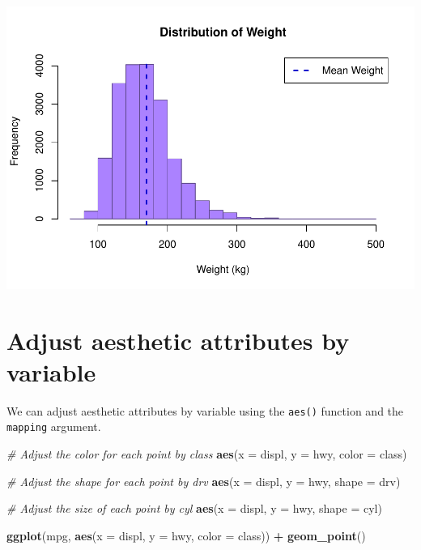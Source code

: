 \documentclass[
]{book}
\newenvironment{Shaded}{\begin{snugshade}}{\end{snugshade}}
\newcommand{\CommentTok}[1]{\textcolor[rgb]{0.56,0.35,0.01}{\textit{#1}}}
\newcommand{\DataTypeTok}[1]{\textcolor[rgb]{0.13,0.29,0.53}{#1}}
\newcommand{\KeywordTok}[1]{\textcolor[rgb]{0.13,0.29,0.53}{\textbf{#1}}}
\newcommand{\NormalTok}[1]{#1}
\newcommand{\OperatorTok}[1]{\textcolor[rgb]{0.81,0.36,0.00}{\textbf{#1}}}
\newcommand{\StringTok}[1]{\textcolor[rgb]{0.31,0.60,0.02}{#1}}
\begin{document}
\includegraphics{_main_files/figure-latex/unnamed-chunk-252-1.pdf}

\hypertarget{adjust-aesthetic-attributes-by-variable}{%
\section{Adjust aesthetic attributes by variable}\label{adjust-aesthetic-attributes-by-variable}}

We can adjust aesthetic attributes by variable using the \texttt{aes()} function and the \texttt{mapping} argument.

\begin{Shaded}
\begin{Highlighting}[]
\CommentTok{# Adjust the color for each point by class}
\KeywordTok{aes}\NormalTok{(}\DataTypeTok{x =}\NormalTok{ displ, }\DataTypeTok{y =}\NormalTok{ hwy, }\DataTypeTok{color =}\NormalTok{ class)}

\CommentTok{# Adjust the shape for each point by drv}
\KeywordTok{aes}\NormalTok{(}\DataTypeTok{x =}\NormalTok{ displ, }\DataTypeTok{y =}\NormalTok{ hwy, }\DataTypeTok{shape =}\NormalTok{ drv)}

\CommentTok{# Adjust the size of each point by cyl}
\KeywordTok{aes}\NormalTok{(}\DataTypeTok{x =}\NormalTok{ displ, }\DataTypeTok{y =}\NormalTok{ hwy, }\DataTypeTok{shape =}\NormalTok{ cyl)}
\end{Highlighting}
\end{Shaded}

\begin{Shaded}
\begin{Highlighting}[]
\KeywordTok{ggplot}\NormalTok{(mpg, }\KeywordTok{aes}\NormalTok{(}\DataTypeTok{x =}\NormalTok{ displ, }\DataTypeTok{y =}\NormalTok{ hwy, }\DataTypeTok{color =}\NormalTok{ class)) }\OperatorTok{+}\StringTok{ }\KeywordTok{geom_point}\NormalTok{()}
\end{Highlighting}
\end{Shaded}
\end{document}
